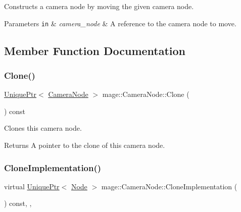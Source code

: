 Constructs a camera node by moving the given camera node.


\begin{DoxyParams}[1]{Parameters}
\mbox{\tt in}  & {\em camera\+\_\+node} & A reference to the camera node to move. \\
\hline
\end{DoxyParams}


\subsection{Member Function Documentation}
\hypertarget{classmage_1_1_camera_node_a6c636830efadf9753f2f0d012153d61f}{}\label{classmage_1_1_camera_node_a6c636830efadf9753f2f0d012153d61f} 
\subsubsection{\texorpdfstring{Clone()}{Clone()}}
{\footnotesize\ttfamily \hyperlink{namespacemage_a3316d7143a973e37adf1110f2e80ca31}{Unique\+Ptr}$<$ \hyperlink{classmage_1_1_camera_node}{Camera\+Node} $>$ mage\+::\+Camera\+Node\+::\+Clone (\begin{DoxyParamCaption}{ }\end{DoxyParamCaption}) const}

Clones this camera node.

\begin{DoxyReturn}{Returns}
A pointer to the clone of this camera node. 
\end{DoxyReturn}
\hypertarget{classmage_1_1_camera_node_a002d3a2b41cda270a26ca5d8f3a17f55}{}\label{classmage_1_1_camera_node_a002d3a2b41cda270a26ca5d8f3a17f55} 
\subsubsection{\texorpdfstring{Clone\+Implementation()}{CloneImplementation()}}
{\footnotesize\ttfamily virtual \hyperlink{namespacemage_a3316d7143a973e37adf1110f2e80ca31}{Unique\+Ptr}$<$ \hyperlink{classmage_1_1_node}{Node} $>$ mage\+::\+Camera\+Node\+::\+Clone\+Implementation (\begin{DoxyParamCaption}{ }\end{DoxyParamCaption}) const\hspace{0.3cm}{\ttfamily [override]}, {\ttfamily [private]}, {}}

